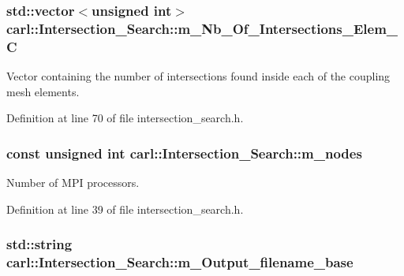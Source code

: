 \subsubsection[{m\+\_\+\+Nb\+\_\+\+Of\+\_\+\+Intersections\+\_\+\+Elem\+\_\+\+C}]{\setlength{\rightskip}{0pt plus 5cm}std\+::vector$<$unsigned int$>$ carl\+::\+Intersection\+\_\+\+Search\+::m\+\_\+\+Nb\+\_\+\+Of\+\_\+\+Intersections\+\_\+\+Elem\+\_\+\+C\hspace{0.3cm}{\ttfamily [protected]}}\label{classcarl_1_1_intersection___search_af54d17052502ee0d11ec33b915e2074e}


Vector containing the number of intersections found inside each of the coupling mesh elements. 



Definition at line 70 of file intersection\+\_\+search.\+h.

\hypertarget{classcarl_1_1_intersection___search_adcfd59960cfd05bc63e9bcf5a350a8ae}{}
\subsubsection[{m\+\_\+nodes}]{\setlength{\rightskip}{0pt plus 5cm}const unsigned int carl\+::\+Intersection\+\_\+\+Search\+::m\+\_\+nodes\hspace{0.3cm}{\ttfamily [protected]}}\label{classcarl_1_1_intersection___search_adcfd59960cfd05bc63e9bcf5a350a8ae}


Number of M\+P\+I processors. 



Definition at line 39 of file intersection\+\_\+search.\+h.

\hypertarget{classcarl_1_1_intersection___search_a5f8d2ac04fc72c209ec92958552e41f5}{}
\subsubsection[{m\+\_\+\+Output\+\_\+filename\+\_\+base}]{\setlength{\rightskip}{0pt plus 5cm}std\+::string carl\+::\+Intersection\+\_\+\+Search\+::m\+\_\+\+Output\+\_\+filename\+\_\+base\hspace{0.3cm}{\ttfamily [protected]}}\label{classcarl_1_1_intersection___search_a5f8d2ac04fc72c209ec92958552e41f5}


